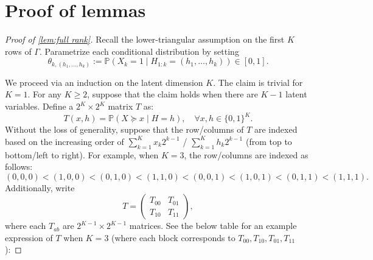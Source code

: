 \documentclass[10pt]{article} %
\newcommand{\PP}{\mathbb P}
\begin{document}
\section{Proof of lemmas}\label{sec:pf of lemmas}

\begin{proof}[Proof of \cref{lem:full rank}]
    Recall the lower-triangular assumption on the first $K$ rows of $\Gamma$.
    Parametrize each conditional distribution by setting 
    $$\theta_{k, (h_1, \ldots, h_k)} := \PP(X_k = 1 \mid H_{1:k} = (h_1, \ldots, h_k)) \in [0,1].$$
    
    We proceed via an induction on the latent dimension $K$. The claim is trivial for $K=1$. For any $K \ge 2$, suppose that the claim holds when there are $K-1$ latent variables. Define a $2^K \times 2^K$ matrix $T$ as:
    $$T(x, h) = \PP(X \succeq x \mid H = h), \quad \forall x, h\in \{0,1\}^K.$$
    Without the loss of generality, suppose that the row/columns of $T$ are indexed based on the increasing order of $\sum_{k=1}^K x_k 2^{k-1}$ / $\sum_{k=1}^K h_k 2^{k-1}$ (from top to bottom/left to right).
    For example, when $K=3$, the row/columns are indexed as follows:
    $$(0,0,0) < (1,0,0) < (0,1,0) < (1,1,0) < (0,0,1) < (1,0,1) < (0,1,1) < (1,1,1).$$
    Additionally, write
    $$T = \begin{pmatrix}
        T_{00} & T_{01} \\
        T_{10} & T_{11}
    \end{pmatrix},$$
    where each $T_{ab}$ are $2^{K-1} \times 2^{K-1}$ matrices.
    See the below table for an example expression of $T$ when $K=3$ (where each block corresponds to $T_{00}, T_{10}, T_{01}, T_{11}$):


\end{proof}
\end{document}

